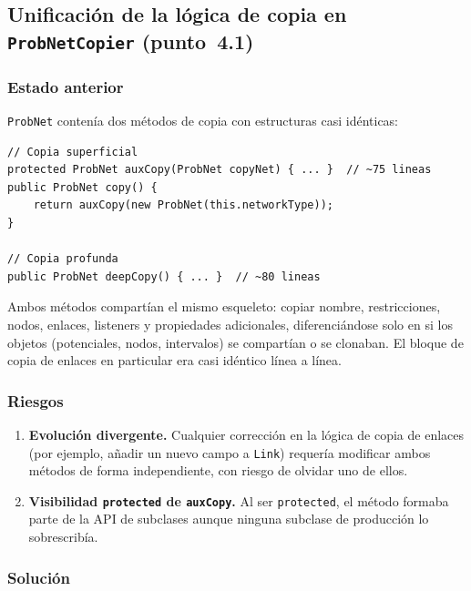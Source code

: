 \documentclass[11pt,a4paper]{article}
\newcommand{\code}[1]{\texttt{#1}}
\begin{document}
\subsection{Unificación de la lógica de copia en \code{ProbNetCopier}
            (punto~4.1)}

\subsubsection*{Estado anterior}

\code{ProbNet} contenía dos métodos de copia con estructuras casi idénticas:

\begin{lstlisting}
// Copia superficial
protected ProbNet auxCopy(ProbNet copyNet) { ... }  // ~75 lineas
public ProbNet copy() {
    return auxCopy(new ProbNet(this.networkType));
}

// Copia profunda
public ProbNet deepCopy() { ... }  // ~80 lineas
\end{lstlisting}

Ambos métodos compartían el mismo esqueleto: copiar nombre, restricciones,
nodos, enlaces, listeners y propiedades adicionales, diferenciándose solo
en si los objetos (potenciales, nodos, intervalos) se compartían o se
clonaban. El bloque de copia de enlaces en particular era casi idéntico
línea a línea.

\subsubsection*{Riesgos}

\begin{enumerate}[label=(\alph*)]
  \item \textbf{Evolución divergente.} Cualquier corrección en la lógica
    de copia de enlaces (por ejemplo, añadir un nuevo campo a \code{Link})
    requería modificar ambos métodos de forma independiente, con riesgo de
    olvidar uno de ellos.
  \item \textbf{Visibilidad \code{protected} de \code{auxCopy}.} Al ser
    \code{protected}, el método formaba parte de la API de subclases aunque
    ninguna subclase de producción lo sobrescribía.
\end{enumerate}

\subsubsection*{Solución}
\end{document}
